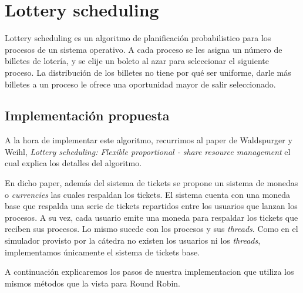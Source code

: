 \section{Lottery scheduling}
Lottery scheduling es un algoritmo de planificaci\'on probabilistico para los procesos de un sistema operativo. A cada proceso se les asigna un n\'umero de billetes de loter\'ia, y se elije un boleto al azar para seleccionar el siguiente proceso. La distribución de los billetes no tiene por qu\'e ser uniforme, darle más billetes a un proceso le ofrece una oportunidad mayor de salir seleccionado.

\subsection{Implementaci\'on propuesta}
A la hora de implementar este algoritmo, recurrimos al paper de Waldspurger y Weihl, \textit{Lottery scheduling: Flexible proportional - share resource management} el cual explica los detalles del algoritmo. 

En dicho paper, adem\'as del sistema de tickets se propone un sistema de monedas o \textit{currencies} las cuales respaldan los tickets. El sistema cuenta con una moneda base que respalda una serie de tickets repartidos entre los usuarios que lanzan los procesos. A su vez, cada usuario emite una moneda para respaldar los tickets que reciben sus procesos. Lo mismo sucede con los procesos y sus \textit{threads}. Como en el simulador provisto por la c\'atedra no existen los usuarios ni los \textit{threads}, implementamos \'unicamente el sistema de tickets base.

A continuaci\'on explicaremos los pasos de nuestra implementacion que utiliza los mismos m\'etodos que la vista para Round Robin.

